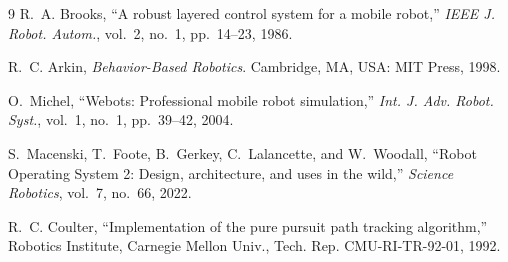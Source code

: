 \documentclass[conference,a4paper]{IEEEtran}
\begin{document}
\begin{thebibliography}{9}
R.~A. Brooks, ``A robust layered control system for a mobile robot,''
\emph{IEEE J. Robot. Autom.}, vol.~2, no.~1, pp.~14--23, 1986.

R.~C. Arkin, \emph{Behavior-Based Robotics}. Cambridge, MA, USA: MIT Press,
1998.

O.~Michel, ``Webots: Professional mobile robot simulation,''
\emph{Int. J. Adv. Robot. Syst.}, vol.~1, no.~1, pp.~39--42, 2004.

S.~Macenski, T.~Foote, B.~Gerkey, C.~Lalancette, and W.~Woodall,
``Robot Operating System 2: Design, architecture, and uses in the wild,''
\emph{Science Robotics}, vol.~7, no.~66, 2022.

R.~C. Coulter, ``Implementation of the pure pursuit path tracking algorithm,''
Robotics Institute, Carnegie Mellon Univ., Tech. Rep. CMU-RI-TR-92-01, 1992.
\end{thebibliography}
\end{document}
